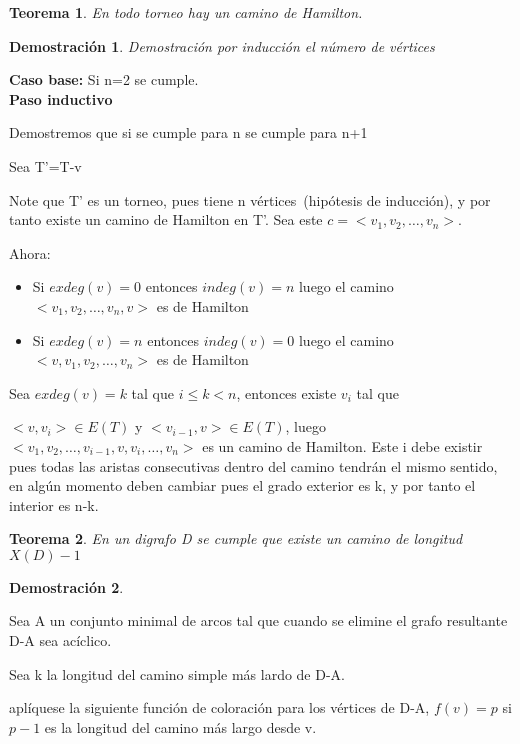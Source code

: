 \documentclass[a4paper,1pt]{report}
\newtheorem*{teo}{Teorema}
\newtheorem*{dem}{Demostración}
\begin{document}
\begin{teo}
 En todo torneo hay un camino de Hamilton.
\end{teo}

\begin{dem}
 Demostración por inducción el número de vértices
\end{dem}

\textbf{Caso base:} Si n=2 se cumple.\\

\textbf{Paso inductivo}

Demostremos que si se cumple para n se cumple para n+1

Sea T'=T-{v}

Note que T' es un torneo, pues tiene n vértices~(hipótesis de inducción), y por tanto existe un camino de Hamilton en T'. Sea este $c=<v_1,v_2,\dots,v_n>$.

Ahora:
\begin{itemize}
 \item Si $exdeg(v)=0$ entonces $indeg(v)=n$ luego el camino $<v_1,v_2,\dots,v_n,v>$ es de Hamilton
 \item Si $exdeg(v)=n$ entonces $indeg(v)=0$ luego el camino $<v,v_1,v_2,\dots,v_n>$ es de Hamilton
\end{itemize}

Sea $exdeg(v)=k$ tal que $i\leq k < n$, entonces existe $v_i$ tal que 

$<v,v_i>\in E(T)$ y $<v_{i- 1},v>\in E(T)$, luego $<v_1,v_2,\dots,v_{i-1},v,v_i,\dots,v_n>$ es un camino de Hamilton. Este i debe existir pues todas las aristas consecutivas dentro del camino tendrán el mismo sentido, en algún momento deben cambiar pues el grado exterior es k, y por tanto el interior es n-k.

\begin{teo}
 En un digrafo D se cumple que existe un camino de longitud $X(D)-1$
\end{teo}

\begin{dem}
 
\end{dem}


Sea A un conjunto minimal de arcos tal que cuando se elimine el grafo resultante D-A sea acíclico.

Sea k la longitud del camino simple más lardo de D-A.

aplíquese la siguiente función de coloración  para los vértices de D-A, $f(v)=p$ si $p-1$ es la longitud del camino más largo desde v.
\end{document}
